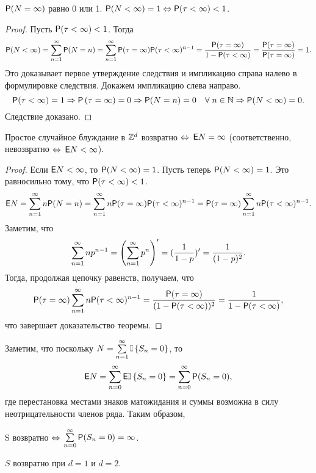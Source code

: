 \begin{imp}
	$\mathsf{P}(N = \infty)$ равно 0 или 1.
	$\mathsf{P}(N < \infty) = 1 \Leftrightarrow \mathsf{P}(\tau < \infty) < 1$.
\end{imp}

\begin{proof}
	Пусть $\mathsf{P}(\tau < \infty) < 1$.
	Тогда
	\[
		\mathsf{P}(N < \infty) = \sum\limits_{n=1}^{\infty} \mathsf{P}(N = n) = \sum\limits_{n=1}^{\infty} \mathsf{P}(\tau = \infty) \mathsf{P}(\tau < \infty)^{n-1}
		= \frac{\mathsf{P}(\tau = \infty)}{1 - \mathsf{P}(\tau < \infty)} = \frac{\mathsf{P}(\tau = \infty)}{\mathsf{P}(\tau = \infty)} = 1.
	\]
	Это доказывает первое утверждение следствия и импликацию справа налево в формулировке следствия.
	Докажем импликацию слева направо.
	\[
		\mathsf{P}(\tau < \infty) = 1 \Rightarrow \mathsf{P} \left(\tau = \infty \right) = 0 \Rightarrow \mathsf{P}(N = n) = 0
			\quad \forall\; n \in \mathbb{N} \Rightarrow \mathsf{P}(N < \infty) = 0.
	\]
	Следствие доказано.
\end{proof}

\begin{theorem}
	Простое случайное блуждание в $\mathbb{Z}^d$ возвратно $\Leftrightarrow$ $\mathsf{E} N = \infty$
	(соответственно, невозвратно $\Leftrightarrow$ $\mathsf{E} N < \infty$).
\end{theorem}

\begin{proof}
	Если $\mathsf{E} N < \infty$, то $\mathsf{P}(N<\infty) = 1$.
	Пусть теперь $\mathsf{P}(N<\infty) = 1$.
	Это равносильно тому, что $\mathsf{P}(\tau < \infty) < 1$.
	\[
		\mathsf{E} N = \sum\limits_{n=1}^{\infty} n\mathsf{P}(N=n)
	=	\sum\limits_{n=1}^{\infty} n\mathsf{P}(\tau = \infty)\mathsf{P}(\tau < \infty)^{n-1}
	=	\mathsf{P}(\tau = \infty)\sum\limits_{n=1}^{\infty} n\mathsf{P}(\tau < \infty)^{n-1}.
	\]
	Заметим, что
	\[
		\sum\limits_{n=1}^{\infty} np^{n-1} = \left(\sum\limits_{n=1}^{\infty} p^n\right)^{\prime} = (\frac1{1-p})^{\prime} = \frac1{(1-p)^2}.
	\]
	Тогда, продолжая цепочку равенств, получаем, что
	\[
		\mathsf{P}(\tau = \infty)\sum\limits_{n=1}^{\infty} n\mathsf{P}(\tau < \infty)^{n-1} =
		\frac{\mathsf{P}(\tau = \infty)}{(1 - \mathsf{P}(\tau < \infty))^2} = \frac1{1 - \mathsf{P}(\tau < \infty)},
	\]
	что завершает доказательство теоремы.
\end{proof}

\begin{note}
	Заметим, что поскольку $N = \sum\limits_{n=1}^{\infty} \mathbb{I} \left\{S_n = 0\right\}$, то
	\[
		\mathsf{E} N = \sum\limits_{n=0}^{\infty} \mathsf{E} \mathbb{I} \left\{S_n = 0\right\} = \sum\limits_{n=0}^{\infty} \mathsf{P}(S_n = 0),
	\]
	где перестановка местами знаков матожидания и суммы возможна в силу неотрицательности членов ряда.
	Таким образом,
	\begin{center}
		S возвратно $\Leftrightarrow$ $\sum\limits_{n=0}^{\infty} \mathsf{P}(S_n = 0) = \infty$.
	\end{center}
\end{note}

\begin{imp}
	$S$ возвратно при $d = 1$ и $d = 2$.
\end{imp}

